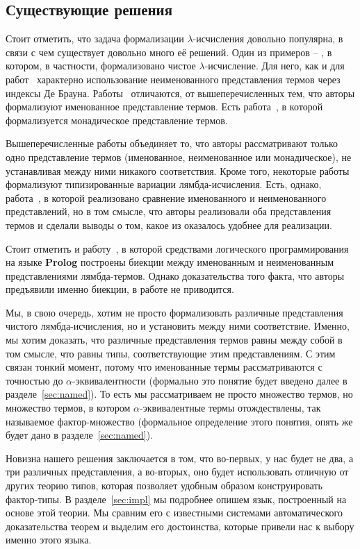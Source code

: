 \subsection{Существующие решения}

Стоит отметить, что задача формализации $\lambda$-исчисления довольно популярна, в связи с чем существует довольно много её решений. Один из примеров -- \cite{lambdaForm}, в котором, в частности, формализовано чистое $\lambda$-исчисление. Для него, как и для работ~\cite{shankar1988mechanical, altenkirch1993formalization, barras1996coq, nipkow1996more, huet1994residual} характерно использование неименованного представления термов через индексы Де Брауна. Работы~\cite{mckinna1999some, coquand1996algorithm, gabbay1999new, gordon1996five, sato1983theory, stoughton1988substitution} отличаются, от вышеперечисленных тем, что авторы формализуют именованное представление термов. Есть работа~\cite{altenkirch1999monadic}, в которой формализуется монадическое представление термов.

Вышеперечисленные работы объединяет то, что авторы рассматривают только одно представление термов (именованное, неименованное или монадическое), не устанавливая между ними никакого соответствия. Кроме того, некоторые работы формализуют типизированные вариации лямбда-исчисления. Есть, однако, работа~\cite{berghofer2007head}, в которой реализовано сравнение именованного и неименованного представлений, но в том смысле, что авторы реализовали оба представления термов и сделали выводы о том, какое из оказалось удобнее для реализации.

Стоит отметить и работу~\cite{tarau2015logic}, в которой средствами логического программирования на языке \textbf{Prolog} построены биекции между именованным и неименованным представлениями лямбда-термов. Однако доказательства того факта, что авторы предъявили именно биекции, в работе не приводится.

Мы, в свою очередь, хотим не просто формализовать различные представления чистого лямбда-исчисления, но и установить между ними соответствие. Именно, мы хотим доказать, что различные представления термов равны между собой в том смысле, что равны типы, соответствующие этим представлениям. С этим связан тонкий момент, потому что именованные термы рассматриваются с точностью до $\alpha$-эквивалентности (формально это понятие будет введено далее в разделе~\ref{sec:named}). То есть мы рассматриваем не просто множество термов, но множество термов, в котором $\alpha$-эквивалентные термы отождествлены, так называемое фактор-множество (формальное определение этого понятия, опять же будет дано в разделе~\ref{sec:named}).

Новизна нашего решения заключается в том, что во-первых, у нас будет не два, а три различных представления, а во-вторых, оно будет использовать отличную от других теорию типов, которая позволяет удобным образом конструировать фактор-типы. В разделе~\ref{sec:impl} мы подробнее опишем язык, построенный на основе этой теории. Мы сравним его с известными системами автоматического доказательства теорем и выделим его достоинства, которые привели нас к выбору именно этого языка.
